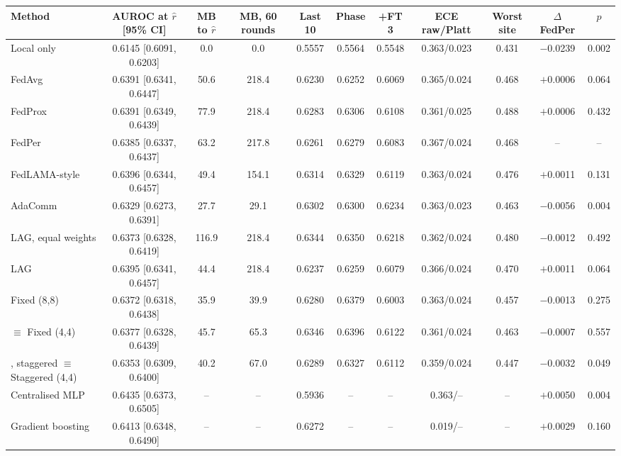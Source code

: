 \begin{tabular}{@{}lcccccccccc@{}}
\toprule
Method & AUROC at $\hat r$ [95\% CI] & MB to $\hat r$ & MB, 60 rounds & Last 10 & Phase & +FT 3 & ECE raw/Platt & Worst site & $\Delta$ FedPer & $p$\\
\midrule
Local only & 0.6145 [0.6091, 0.6203] & 0.0 & 0.0 & 0.5557 & 0.5564 & 0.5548 & 0.363/0.023 & 0.431 & \ensuremath{-}0.0239 & 0.002\\
FedAvg & 0.6391 [0.6341, 0.6447] & 50.6 & 218.4 & 0.6230 & 0.6252 & 0.6069 & 0.365/0.024 & 0.468 & \ensuremath{+}0.0006 & 0.064\\
FedProx & 0.6391 [0.6349, 0.6439] & 77.9 & 218.4 & 0.6283 & 0.6306 & 0.6108 & 0.361/0.025 & 0.488 & \ensuremath{+}0.0006 & 0.432\\
FedPer & 0.6385 [0.6337, 0.6437] & 63.2 & 217.8 & 0.6261 & 0.6279 & 0.6083 & 0.367/0.024 & 0.468 & -- & --\\
FedLAMA-style & 0.6396 [0.6344, 0.6457] & 49.4 & 154.1 & 0.6314 & 0.6329 & 0.6119 & 0.363/0.024 & 0.476 & \ensuremath{+}0.0011 & 0.131\\
AdaComm & 0.6329 [0.6273, 0.6391] & 27.7 & 29.1 & 0.6302 & 0.6300 & 0.6234 & 0.363/0.023 & 0.463 & \ensuremath{-}0.0056 & 0.004\\
LAG, equal weights & 0.6373 [0.6328, 0.6419] & 116.9 & 218.4 & 0.6344 & 0.6350 & 0.6218 & 0.362/0.024 & 0.480 & \ensuremath{-}0.0012 & 0.492\\
LAG & 0.6395 [0.6341, 0.6457] & 44.4 & 218.4 & 0.6237 & 0.6259 & 0.6079 & 0.366/0.024 & 0.470 & \ensuremath{+}0.0011 & 0.064\\
Fixed (8,8) & 0.6372 [0.6318, 0.6438] & 35.9 & 39.9 & 0.6280 & 0.6379 & 0.6003 & 0.363/0.024 & 0.457 & \ensuremath{-}0.0013 & 0.275\\
\tierfed{} $\equiv$ Fixed (4,4) & 0.6377 [0.6328, 0.6439] & 45.7 & 65.3 & 0.6346 & 0.6396 & 0.6122 & 0.361/0.024 & 0.463 & \ensuremath{-}0.0007 & 0.557\\
\tierfed{}, staggered $\equiv$ Staggered (4,4) & 0.6353 [0.6309, 0.6400] & 40.2 & 67.0 & 0.6289 & 0.6327 & 0.6112 & 0.359/0.024 & 0.447 & \ensuremath{-}0.0032 & 0.049\\
\midrule
Centralised MLP & 0.6435 [0.6373, 0.6505] & -- & -- & 0.5936 & -- & -- & 0.363/-- & -- & \ensuremath{+}0.0050 & 0.004\\
Gradient boosting & 0.6413 [0.6348, 0.6490] & -- & -- & 0.6272 & -- & -- & 0.019/-- & -- & \ensuremath{+}0.0029 & 0.160\\
\bottomrule
\end{tabular}
